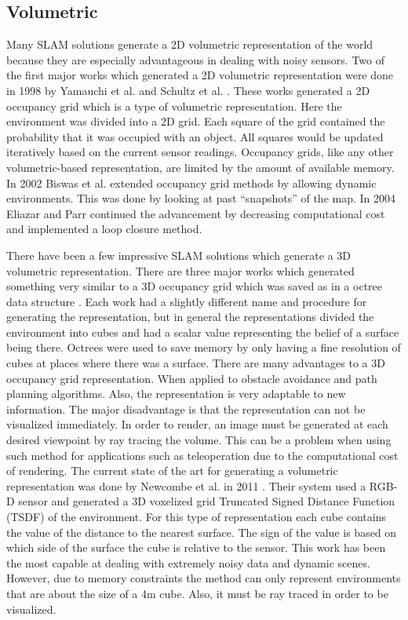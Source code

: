 \subsection{Volumetric}

Many SLAM solutions generate a 2D volumetric representation of the world
because they are especially advantageous in dealing with noisy sensors. Two
of the first major works which generated a 2D volumetric representation
were done in 1998 by Yamauchi et al. \cite{Yamauchi1998} and Schultz et al.
\cite{Schultz1998}. These works generated a 2D occupancy grid which is a
type of volumetric representation. Here the environment was divided into a
2D grid.  Each square of the grid contained the probability that it was
occupied with an object. All squares would be updated iteratively based on
the current sensor readings. Occupancy grids, like any other
volumetric-based representation, are limited by the amount of available
memory. In 2002 Biswas et al. \cite{Biswas2002} extended occupancy grid
methods by allowing dynamic environments. This was done by looking at past
``snapshots'' of the map. In 2004 Eliazar and Parr \cite{Eliazar2004}
continued the advancement by decreasing computational cost and implemented
a loop closure method.

There have been a few impressive SLAM solutions which generate a 3D
volumetric representation. There are three major works which generated
something very similar to a 3D occupancy grid which was saved as in a
octree data structure
\cite{Magnusson2007,Nuchter2007,Huang2011,Endres2012}. Each work had a
slightly different name and procedure for generating the representation,
but in general the representations divided the environment into cubes and
had a scalar value representing the belief of a surface being there.
Octrees were used to save memory by only having a fine resolution of cubes
at places where there was a surface. There are many advantages to a 3D
occupancy grid representation. When applied to obstacle avoidance and path
planning algorithms. Also, the representation is very adaptable to new
information. The major disadvantage is that the representation can not be
visualized immediately. In order to render, an image must be generated at
each desired viewpoint by ray tracing the volume. This can be a problem
when using such method for applications such as teleoperation due to the
computational cost of rendering. The current state of the art for
generating a volumetric representation was done by Newcombe et al.  in 2011
\cite{Newcombe2011a}.  Their system used a RGB-D sensor and generated a 3D
voxelized grid Truncated Signed Distance Function (TSDF) of the
environment. For this type of representation each cube contains the value
of the distance to the nearest surface. The sign of the value is based on
which side of the surface the cube is relative to the sensor. This work has
been the most capable at dealing with extremely noisy data and dynamic
scenes. However, due to memory constraints the method can only represent
environments that are about the size of a 4m cube. Also, it must be ray
traced in order to be visualized.

